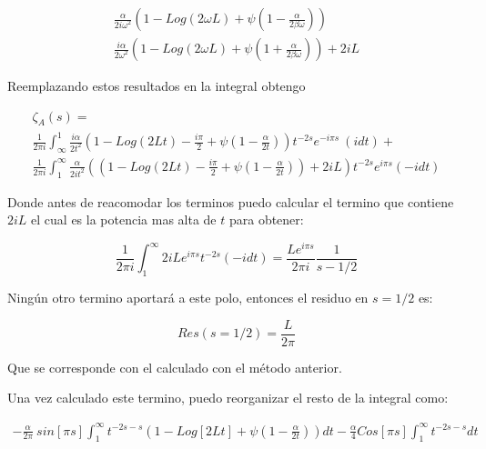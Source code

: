 \begin{equation}
\begin{array}{c}
    \frac{\alpha}{2 i \omega ^2}
    \left(
    1 - Log(2 \omega L ) + \psi (1-\frac{\alpha}{2 \beta \omega})
    \right) \\
    \frac{i \alpha}{2 \omega ^2}
    \left(
    1 - Log(2 \omega L ) + \psi  (1  + \frac{\alpha}{2 \beta \omega})
    \right) + 
    2 i L
\end{array}
\end{equation}

Reemplazando estos resultados en la integral obtengo 

\begin{equation}
\begin{array}{c}
    \zeta _A (s) = \\
     \frac{1}{2 \pi i} \int _{\infty} ^{1}
     \frac{i \alpha}{2 t^2}
     \left(
     1 - Log(2 L t) - \frac{i \pi}{2} + \psi (1-\frac{\alpha}{2 t})
     \right)
     t^{-2 s}
     e^{-i \pi s} \ 
     (i dt) + \\
     \frac{1}{2 \pi i} \int _1 ^{\infty}
     \frac{ \alpha}{2 i t^2}
     \left(
     \left(
     1 - Log(2 L t) - \frac{i \pi}{2} + \psi (1-\frac{\alpha}{2 t}) 
     \right)
     + 2 i L
     \right)
     t^{-2 s}
     e^{i \pi s}
     (-i dt)
     
\end{array}
\end{equation}

Donde antes de reacomodar los terminos puedo calcular el termino que contiene $2iL$ el cual es la potencia mas alta de $t$ para obtener: 

\begin{equation}
    \frac{1}{2 \pi i }
    \int _1 ^{\infty}
    2 i L
    e^{i \pi s}
    t ^{-2 s}
    (-i dt) =  
    \frac{L e^{i \pi s} }{2 \pi i} \frac{1}{s-1/2   }
\end{equation}

Ningún otro termino aportará a este polo, entonces el residuo en $s= 1/2$ es:

\begin{equation}
    Res (s=1/2) = \frac{L}{2 \pi}
\end{equation}

Que se corresponde con el calculado con el método anterior.

Una vez calculado este termino, puedo reorganizar el resto de la integral como:

\begin{equation}
\begin{array}{c}
    - \frac{\alpha}{2 \pi} \ sin[\pi s]
    \int _1 ^{\infty}
    t ^{-2 s-s} 
    \left(
    1 - Log[2Lt] + \psi (1- \frac{\alpha}{2t})
    \right) dt - 
    \frac{\alpha}{4} 
    Cos[\pi s]
    \int _1 ^{\infty} t^{-2s-s} dt
\end{array}
\end{equation}

